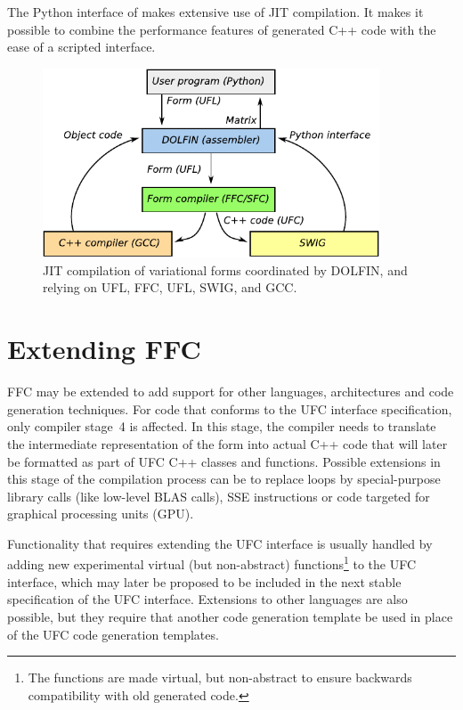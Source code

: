 The Python interface of \dolfin{} makes extensive use of JIT
compilation. It makes it possible to combine the performance features
of generated C++ code with the ease of a scripted interface.

\begin{figure}
  \begin{center}
    \includegraphics[width=10cm]{chapters/logg-1/pdf/jit.pdf}
    \caption{JIT compilation of variational forms coordinated by
      DOLFIN, and relying on UFL, FFC, UFL, SWIG, and GCC.}
    \label{fig:logg-1:jit}
  \end{center}
\end{figure}

\section{Extending FFC}

FFC may be extended to add support for other languages, architectures
and code generation techniques. For code that conforms to the UFC
interface specification, only compiler stage~4 is affected. In this
stage, the compiler needs to translate the intermediate representation
of the form into actual C++ code that will later be formatted as part
of UFC C++ classes and functions. Possible extensions in this stage of
the compilation process can be to replace loops by special-purpose
library calls (like low-level BLAS calls), SSE instructions or code
targeted for graphical processing units (GPU).

Functionality that requires extending the UFC interface is usually
handled by adding new experimental virtual (but non-abstract)
functions\footnote{The functions are made virtual, but non-abstract to
  ensure backwards compatibility with old generated code.} to the UFC
interface, which may later be proposed to be included in the next
stable specification of the UFC interface. Extensions to other
languages are also possible, but they require that another code
generation template be used in place of the UFC code generation
templates.

